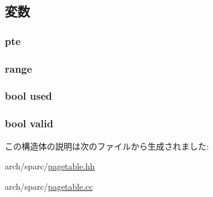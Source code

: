 \subsection{変数}
\hypertarget{structSparcISA_1_1TlbEntry_a97776a0e0f255c02dcb71ea59ea2c551}{
\subsubsection[{pte}]{ {\bf pte}}}
\label{structSparcISA_1_1TlbEntry_a97776a0e0f255c02dcb71ea59ea2c551}
\hypertarget{structSparcISA_1_1TlbEntry_a11b43184b3c2df2015fefa5beb543d55}{
\subsubsection[{range}]{ {\bf range}}}
\label{structSparcISA_1_1TlbEntry_a11b43184b3c2df2015fefa5beb543d55}
\hypertarget{structSparcISA_1_1TlbEntry_accd366cbfd7b8a1b904ca4177a894f95}{
\subsubsection[{used}]{\setlength{\rightskip}{0pt plus 5cm}bool {\bf used}}}
\label{structSparcISA_1_1TlbEntry_accd366cbfd7b8a1b904ca4177a894f95}
\hypertarget{structSparcISA_1_1TlbEntry_a28e3c179a86f337095088b3ca02a2b2a}{
\subsubsection[{valid}]{\setlength{\rightskip}{0pt plus 5cm}bool {\bf valid}}}
\label{structSparcISA_1_1TlbEntry_a28e3c179a86f337095088b3ca02a2b2a}


この構造体の説明は次のファイルから生成されました:\begin{DoxyCompactItemize}
\item 
arch/sparc/\hyperlink{sparc_2pagetable_8hh}{pagetable.hh}\item 
arch/sparc/\hyperlink{sparc_2pagetable_8cc}{pagetable.cc}\end{DoxyCompactItemize}
